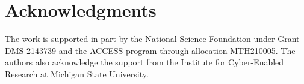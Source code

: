 \documentclass[a4paper,fleqn]{cas-sc}
\theoremstyle{definition}
\theoremstyle{remark}
\begin{document}



\section*{Acknowledgments}
The work is supported in part by the National Science Foundation under Grant DMS-2143739 and the ACCESS program through allocation MTH210005. 
The authors also acknowledge the support from the Institute for Cyber-Enabled Research at Michigan State University.










\end{document}
